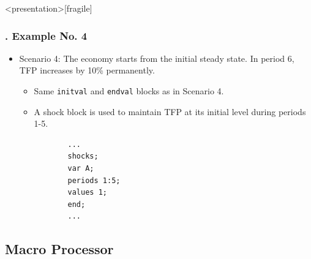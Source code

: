 \documentclass[11pt,aspectratio=169]{beamer}
\begin{document}
\begin{frame}<presentation>[fragile]
	\frametitle{{\thesection.\thesubsection\thinspace\thesubsubsection} Example No. 4}
	\begin{itemize}
		\item Scenario 4: The economy starts from the initial steady state. In period 6, TFP increases by 10\% permanently. 
			\begin{itemize}
				\item Same \texttt{initval} and \texttt{endval} blocks as in Scenario 4.
				\item A shock block is used to maintain TFP at its initial level during periods 1-5.
			\end{itemize}
		\begin{verbatim}
		   ...
		   shocks;
		   var A;
		   periods 1:5;
		   values 1;
		   end;
		   ...
		\end{verbatim}
	\end{itemize}
\end{frame}

\subsection{Macro Processor}
\end{document}

